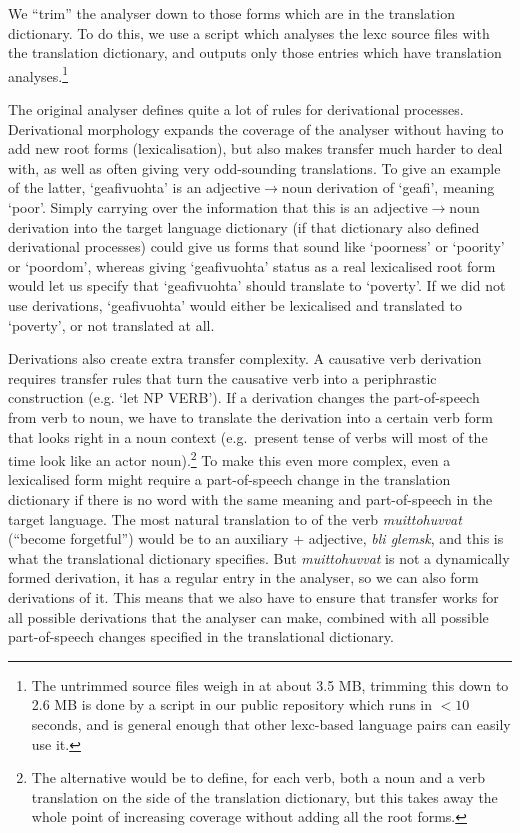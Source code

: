 \documentclass{book}
\begin{document}
We ``trim'' the analyser down to those forms which are in the
translation dictionary. To do this, we use a script which analyses the
lexc source files with the translation dictionary, and outputs only
those entries which have translation analyses.\footnote{The untrimmed
  source files weigh in at about 3.5 MB, trimming this down to 2.6 MB
  is done by a script in our public repository which runs in $<10$
  seconds, and is general enough that other lexc-based language pairs
  can easily use it.}

The original analyser defines quite a lot of rules for derivational
processes. Derivational morphology expands the coverage of the
analyser without having to add new root forms (lexicalisation), but
also makes transfer much harder to deal with, as well as often giving
very odd-sounding translations.
To give an example of the latter, `geafivuohta' is an
adjective$\rightarrow{}$noun derivation of `geafi', meaning `poor'.
Simply carrying over the information that this is an
adjective$\rightarrow{}$noun derivation into the target language
dictionary (if that dictionary also defined derivational processes)
could give us forms that sound like `poorness' or `poority' or
`poordom', whereas giving `geafivuohta' status as a real lexicalised
root form would let us specify that `geafivuohta' should translate to
`poverty'. If we did not use derivations, `geafivuohta' would either
be lexicalised and translated to `poverty', or not translated at all.

Derivations also create extra transfer complexity. A causative verb
derivation requires transfer rules that turn the causative verb into a
periphrastic construction (e.g. `let NP VERB'). If a derivation
changes the part-of-speech from verb to noun, we have to translate the
derivation into a certain verb form that looks right in a noun context
(e.g.~present tense of \nob{} verbs will most of the time look like an
actor noun).\footnote{The alternative would be to define, for each
  \sme{} verb, both a noun and a verb translation on the \nob{} side
  of the translation dictionary, but this takes away the whole point
  of increasing coverage without adding all the root forms.} To make
this even more complex, even a lexicalised form might require a
part-of-speech change in the translation dictionary if there is no
word with the same meaning and part-of-speech in the target language.
The most natural translation to \nob{} of the verb
\textit{muittohuvvat} (``become forgetful'') would be to an auxiliary
+ adjective, \textit{bli glemsk}, and this is what the translational
dictionary specifies. But \textit{muittohuvvat} is not a dynamically
formed derivation, it has a regular entry in the analyser, so we can
also form derivations of it. This means that we also have to ensure
that transfer works for all possible derivations that the analyser can
make, combined with all possible part-of-speech changes specified in
the translational dictionary.
\end{document}
